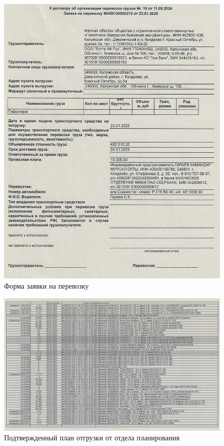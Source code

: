 \begin{figure}
\begin{center}
 \includegraphics[height=0.8\textheight, keepaspectratio]{Pics/X.1.jpg}
\end{center}
 \caption{Форма заявки на перевозку}
 \label{pic:X.1}
\end{figure}

\begin{figure}
\begin{center}
 \includegraphics[height=0.5\textheight, angle=90, keepaspectratio]{Pics/X.8.jpg}
\end{center}
 \caption{Подтвержденный план отгрузки от отдела планирования}
 \label{pic:X.8}
\end{figure}

